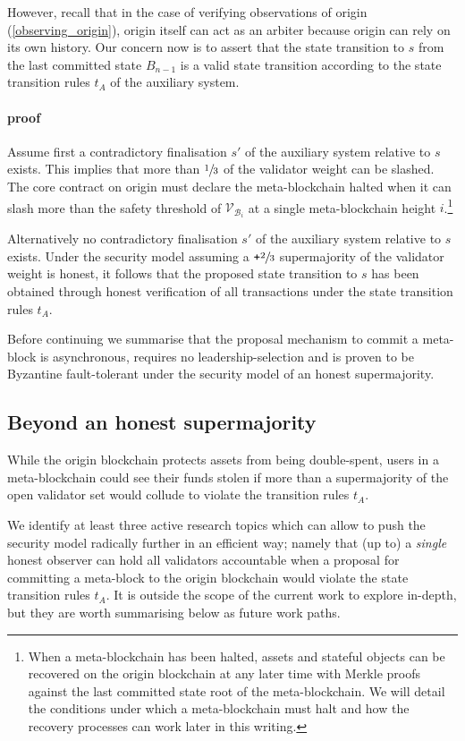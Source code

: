 \documentclass[12pt,a4paper]{article}
\begin{document}
However, recall that in the case of verifying observations of origin (\ref{observing_origin}), origin itself can act as an arbiter because origin can rely on its own history.
Our concern now is to assert that the state transition to $s$ from the last committed state $B_{n-1}$ is a valid state transition according to the state transition rules $t_A$ of the auxiliary system.

\paragraph{proof} Assume first a contradictory finalisation $s'$ of the auxiliary system relative to $s$ exists. This implies that more than $\sfrac{1}{3}$ of the validator weight can be slashed.
The core contract on origin must declare the meta-blockchain halted when it can slash more than the safety threshold of $\mathcal{V}_{\mathcal{B}_i}$ at a single meta-blockchain height $i$.\footnote{When a meta-blockchain has been halted, assets and stateful objects can be recovered on the origin blockchain at any later time with Merkle proofs against the last committed state root of the meta-blockchain.
We will detail the conditions under which a meta-blockchain must halt and how the recovery processes can work later in this writing.}

Alternatively no contradictory finalisation $s'$ of the auxiliary system relative to $s$ exists.
Under the security model assuming a $\texttt{+}\sfrac{2}{3}$ supermajority of the validator weight is honest, it follows that the proposed state transition to $s$ has been obtained through honest verification of all transactions under the state transition rules $t_A$.

Before continuing we summarise that the proposal mechanism to commit a meta-block is asynchronous, requires no leadership-selection and is proven to be Byzantine fault-tolerant under the security model of an honest supermajority.

\subsection{Beyond an honest supermajority}

While the origin blockchain protects assets from being double-spent, users in a meta-blockchain could see their funds stolen if more than a supermajority of the open validator set would collude to violate the transition rules $t_A$. 

We identify at least three active research topics which can allow to push the security model radically further in an efficient way; namely that (up to) a \emph{single} honest observer can hold all validators accountable when a proposal for committing a meta-block to the origin blockchain would violate the state transition rules $t_A$.
It is outside the scope of the current work to explore in-depth, but they are worth summarising below as future work paths.
\end{document}
